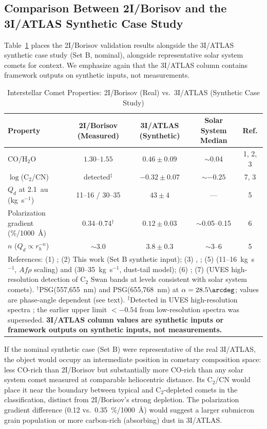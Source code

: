 \documentclass[usenatbib]{mnras}
\begin{document}
\subsection{Comparison Between 2I/Borisov and the 3I/ATLAS Synthetic Case Study}

Table~\ref{tab:comparison} places the 2I/Borisov validation results alongside the 3I/ATLAS synthetic case study (Set B, nominal), alongside representative solar system comets for context. We emphasize again that the 3I/ATLAS column contains framework outputs on synthetic inputs, not measurements.

\begin{table}
\centering
\caption{Interstellar Comet Properties: 2I/Borisov (Real) vs.\ 3I/ATLAS (Synthetic Case Study)\label{tab:comparison}}
\begin{tabular}{lcccc}
\toprule
Property & 2I/Borisov (Measured) & 3I/ATLAS (Synthetic) & Solar System Median & Ref. \\
\midrule
CO/H$_2$O & $1.30$--$1.55$ & $0.46 \pm 0.09$ & $\sim$0.04 & 1, 2, 3 \\
$\log$(C$_2$/CN) & detected$^\ddagger$ & $-0.32 \pm 0.07$ & $\sim -0.25$ & 7, 3 \\
$Q_d$ at 2.1~au (kg~s$^{-1}$) & 11--16 / 30--35 & $43 \pm 4$ & --- & 5 \\
Polarization gradient (\%/1000~\AA) & 0.34--0.74$^\dagger$ & $0.12 \pm 0.03$ & $\sim$0.05--0.15 & 6 \\
$n$ ($Q_d \propto r_h^{-n}$) & $\sim$3.0 & $3.8 \pm 0.3$ & $\sim$3--6 & 5 \\
\bottomrule
\multicolumn{5}{l}{\small References: (1) \citet{bodewits20}; (2) This work (Set B synthetic input); (3) \citet{ahearn95}, \citet{bockelee04}; (5) \citet{clements21} (11--16~kg~s$^{-1}$, $Af\rho$ scaling) and \citet{cremonese20} (30--35~kg~s$^{-1}$, dust-tail model); (6) \citet{bagnulo21}; (7) \citet{opitom21} (UVES high-resolution detection of C$_2$ Swan bands at levels consistent with solar system comets). $^\dagger$PSG(557,655~nm) and PSG(655,768~nm) at $\alpha = 28.5\arcdeg$; values are phase-angle dependent (see text). $^\ddagger$Detected in UVES high-resolution spectra \citep{opitom21}; the earlier upper limit $< -0.54$ from low-resolution spectra \citep{opitom19} was superseded. \textbf{3I/ATLAS column values are synthetic inputs or framework outputs on synthetic inputs, not measurements.}}
\end{tabular}
\end{table}

If the nominal synthetic case (Set B) were representative of the real 3I/ATLAS, the object would occupy an intermediate position in cometary composition space: less CO-rich than 2I/Borisov but substantially more CO-rich than any solar system comet measured at comparable heliocentric distance. Its C$_2$/CN would place it near the boundary between typical and C$_2$-depleted comets in the \citet{ahearn95} classification, distinct from 2I/Borisov's strong depletion. The polarization gradient difference (0.12 vs.\ 0.35~\%/1000~\AA) would suggest a larger submicron grain population or more carbon-rich (absorbing) dust in 3I/ATLAS.
\end{document}
